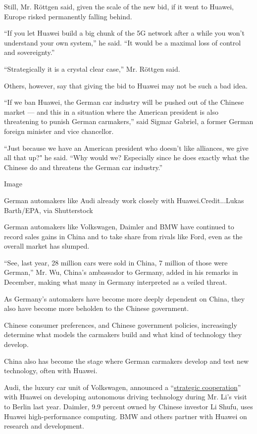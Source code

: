 Still, Mr. Röttgen said, given the scale of the new bid, if it went to
Huawei, Europe risked permanently falling behind.

``If you let Huawei build a big chunk of the 5G network after a while
you won't understand your own system,'' he said. ``It would be a maximal
loss of control and sovereignty.''

``Strategically it is a crystal clear case,'' Mr. Röttgen said.

Others, however, say that giving the bid to Huawei may not be such a bad
idea.

``If we ban Huawei, the German car industry will be pushed out of the
Chinese market --- and this in a situation where the American president
is also threatening to punish German carmakers,'' said Sigmar Gabriel, a
former German foreign minister and vice chancellor.

``Just because we have an American president who doesn't like alliances,
we give all that up?" he said. ``Why would we? Especially since he does
exactly what the Chinese do and threatens the German car industry.''

Image

German automakers like Audi already work closely with
Huawei.Credit...Lukas Barth/EPA, via Shutterstock

German automakers like Volkswagen, Daimler and BMW have continued to
record sales gains in China and to take share from rivals like Ford,
even as the overall market has slumped.

``See, last year, 28 million cars were sold in China, 7 million of those
were German,'' Mr. Wu, China's ambassador to Germany, added in his
remarks in December, making what many in Germany interpreted as a veiled
threat.

As Germany's automakers have become more deeply dependent on China, they
also have become more beholden to the Chinese government.

Chinese consumer preferences, and Chinese government policies,
increasingly determine what models the carmakers build and what kind of
technology they develop.

China also has become the stage where German carmakers develop and test
new technology, often with Huawei.

Audi, the luxury car unit of Volkswagen, announced a
``\href{https://www.audi-mediacenter.com/de/pressemitteilungen/audi-und-huawei-unterzeichnen-absichtserklaerung-zur-strategischen-kooperation-10427}{strategic
cooperation}'' with Huawei on developing autonomous driving technology
during Mr. Li's visit to Berlin last year. Daimler, 9.9 percent owned by
Chinese investor Li Shufu, uses Huawei high-performance computing. BMW
and others partner with Huawei on research and development.


